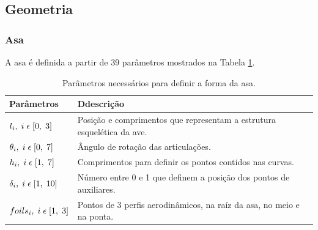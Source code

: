 \documentclass[10pt,a4paper]{report}
\begin{document}
	
\subsection{Geometria}

\subsubsection{Asa}

A asa é definida a partir de 39 parâmetros mostrados na Tabela \ref{tab:wing_parameters}.

\begin{table}[h!]
	\centering
	\caption{Parâmetros necessários para definir a forma da asa.}
	\begin{tabular}{p{3cm}p{8cm}}
		Parâmetros & Ddescrição \\
		\hline
		{$l_{i}, \hspace{0.1cm} i \hspace{0.1cm} \epsilon \hspace{0.1cm} [0, \hspace{0.1cm} 3]$} & Posição e comprimentos que representam a estrutura esquelética da ave. \\
		{$\theta_{i}, \hspace{0.1cm} i \hspace{0.1cm} \epsilon \hspace{0.1cm} [0, \hspace{0.1cm} 7]$} & Ângulo de rotação das articulações. \\
		{$h_{i}, \hspace{0.1cm} i \hspace{0.1cm} \epsilon \hspace{0.1cm} [1, \hspace{0.1cm} 7]$} & Comprimentos para definir os pontos contidos nas curvas. \\
		{$\delta_{i}, \hspace{0.1cm} i \hspace{0.1cm} \epsilon \hspace{0.1cm} [1, \hspace{0.1cm} 10]$} & Número entre 0 e 1 que definem a posição dos pontos de auxiliares. \\
		{$foils_{i}, \hspace{0.1cm} i \hspace{0.1cm} \epsilon \hspace{0.1cm} [1, \hspace{0.1cm} 3]$} &  Pontos de 3 perfis aerodinâmicos, na raíz da asa, no meio e na ponta. \\
		\hline
	\end{tabular}
	\label{tab:wing_parameters}
\end{table}
\end{document}
